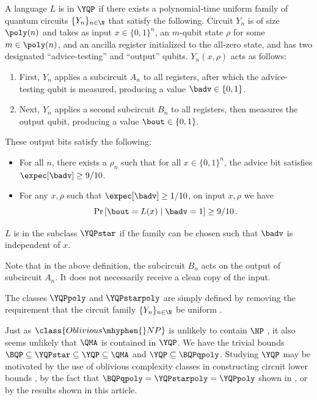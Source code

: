 \begin{definition}\label{def:YQP}
	A language $L$ is in $\YQP$ if there exists a polynomial-time uniform family of
	quantum circuits $\{Y_n\}_{n\in \N}$ that satisfy the following.
	Circuit $Y_n$ is of size $\poly(n)$ and takes as input
	$x\in \{0,1\}^n$, an $m$-qubit state $\rho$ for some $m\in \poly(n)$,
	and an ancilla register initialized to the all-zero state,
	and has two designated ``advice-testing'' and ``output'' qubits.
	$Y_n(x,\rho)$ acts as follows:
	\begin{enumerate}
		\item First, $Y_n$ applies a subcircuit $A_n$ to all registers, after which
		the advice-testing qubit is measured, producing a value $\badv\in\{0,1\}$.
		\item Next, $Y_n$ applies a second subcircuit $B_n$ to all registers,
		then measures the output qubit, producing a value $\bout\in\{0,1\}$.
	\end{enumerate}
	These output bits satisfy the following:
	\begin{itemize}
		\item For all $n$, there exists a $\rho_n$ such that for all $x \in \{0,1\}^n$,
		the advice bit satisfies $\expec[\badv] \geq 9/10$.
		\item For any $x,\rho$ such that $\expec[\badv]\geq 1/10$,
		on input $x,\rho$ we have
		\[
		\Pr\left[\bout = L(x) \mid \badv = 1\right] \geq 9/10 \, .
		\]
	\end{itemize}
	$L$ is in the subclass $\YQPstar$ if the family can be chosen such that
	$\badv$ is independent of $x$.
\end{definition}

Note that in the above definition, the subcircuit $B_n$ acts on the output of subcircuit $A_n$.
It does not necessarily receive a clean copy of the input.

%
The classes $\YQPpoly$ and $\YQPstarpoly$ 
are simply defined
by removing the requirement that the circuit family $\{Y_n\}_{n\in \N}$ be uniform \cite{aaronson2014full}.
%

Just as $\class{Oblivious\mhyphen{}NP}$ is unlikely to contain $\NP$ \cite{fortnow2009fixed},
it also seems unlikely that $\QMA$ is contained in $\YQP$.
We have the trivial bounds $\BQP\subseteq \YQPstar \subseteq \YQP\subseteq \QMA$
and $\YQP\subseteq \BQPqpoly$.
Studying $\YQP$ may be motivated by the use of oblivious complexity classes
in constructing circuit lower bounds \cite{fortnow2009fixed,chakaravarthy2006oblivious,GLV24oblivious},
by the fact that $\BQPqpoly = \YQPstarpoly = \YQPpoly$ shown %
in \cite{aaronson2014full}, %
or by the results shown in this %
article.  %


